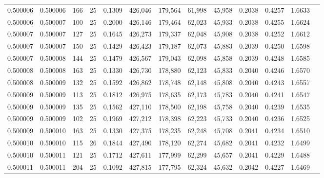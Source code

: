 \begin{tabular}{rrrrrrrrrrrrr}
0.500006 & 0.500006 & 166 &  25 &                                     0.1309 & 426,046 & 179,564 &  61,998 &  45,958 & 0.2038 & 0.4257 & 1.6633 \\
0.500006 & 0.500007 & 100 &  25 &                                     0.2000 & 426,146 & 179,464 &  62,023 &  45,933 & 0.2038 & 0.4255 & 1.6624 \\
0.500007 & 0.500007 & 127 &  25 &                                     0.1645 & 426,273 & 179,337 &  62,048 &  45,908 & 0.2038 & 0.4252 & 1.6612 \\
0.500007 & 0.500007 & 150 &  25 &                                     0.1429 & 426,423 & 179,187 &  62,073 &  45,883 & 0.2039 & 0.4250 & 1.6598 \\
0.500007 & 0.500008 & 144 &  25 &                                     0.1479 & 426,567 & 179,043 &  62,098 &  45,858 & 0.2039 & 0.4248 & 1.6585 \\
0.500008 & 0.500008 & 163 &  25 &                                     0.1330 & 426,730 & 178,880 &  62,123 &  45,833 & 0.2040 & 0.4246 & 1.6570 \\
0.500008 & 0.500009 & 132 &  25 &                                     0.1592 & 426,862 & 178,748 &  62,148 &  45,808 & 0.2040 & 0.4243 & 1.6557 \\
0.500009 & 0.500009 & 113 &  25 &                                     0.1812 & 426,975 & 178,635 &  62,173 &  45,783 & 0.2040 & 0.4241 & 1.6547 \\
0.500009 & 0.500009 & 135 &  25 &                                     0.1562 & 427,110 & 178,500 &  62,198 &  45,758 & 0.2040 & 0.4239 & 1.6535 \\
0.500009 & 0.500009 & 102 &  25 &                                     0.1969 & 427,212 & 178,398 &  62,223 &  45,733 & 0.2040 & 0.4236 & 1.6525 \\
0.500009 & 0.500010 & 163 &  25 &                                     0.1330 & 427,375 & 178,235 &  62,248 &  45,708 & 0.2041 & 0.4234 & 1.6510 \\
0.500010 & 0.500010 & 115 &  26 &                                     0.1844 & 427,490 & 178,120 &  62,274 &  45,682 & 0.2041 & 0.4232 & 1.6499 \\
0.500010 & 0.500011 & 121 &  25 &                                     0.1712 & 427,611 & 177,999 &  62,299 &  45,657 & 0.2041 & 0.4229 & 1.6488 \\
0.500011 & 0.500011 & 204 &  25 &                                     0.1092 & 427,815 & 177,795 &  62,324 &  45,632 & 0.2042 & 0.4227 & 1.6469 \\

\end{tabular}
